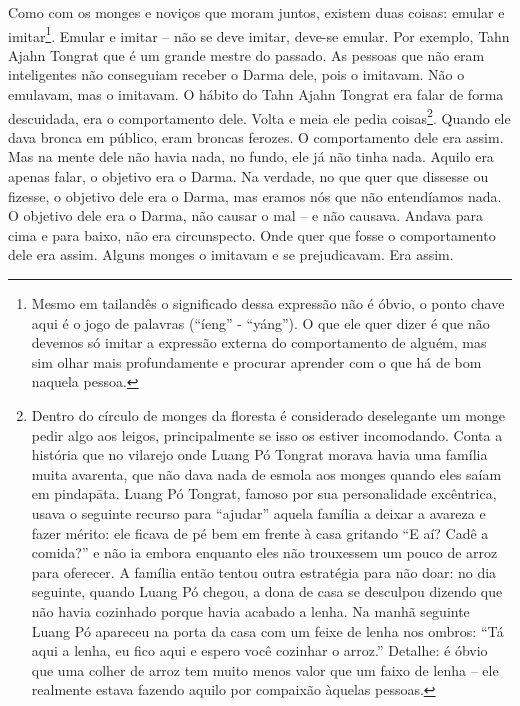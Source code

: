 Como com os monges e noviços que moram juntos, existem duas coisas:
emular e imitar\footnote{Mesmo em tailandês o significado dessa
expressão não é óbvio, o ponto chave aqui é o jogo de palavras
(“íeng” - “yáng”). O que ele quer dizer é que não devemos só imitar a
expressão externa do comportamento de alguém, mas sim olhar mais
profundamente e procurar aprender com o que há de bom naquela pessoa.}.
Emular e imitar – não se deve imitar, deve-se emular. Por exemplo, Tahn
Ajahn Tongrat que é um grande mestre do passado. As pessoas que não
eram inteligentes não conseguiam receber o Darma dele, pois o imitavam.
Não o emulavam, mas o imitavam. O hábito do Tahn Ajahn Tongrat era
falar de forma descuidada, era o comportamento dele. Volta e meia ele
pedia coisas\footnote{Dentro do círculo de monges da floresta é
considerado deselegante um monge pedir algo aos leigos, principalmente
se isso os estiver incomodando. Conta a história que no vilarejo onde
Luang Pó Tongrat morava havia uma família muita avarenta, que não dava
nada de esmola aos monges quando eles saíam em pindapāta. Luang Pó
Tongrat, famoso por sua personalidade excêntrica, usava o seguinte
recurso para “ajudar” aquela família a deixar a avareza e fazer mérito:
ele ficava de pé bem em frente à casa gritando “E aí? Cadê a comida?” e
não ia embora enquanto eles não trouxessem um pouco de arroz para
oferecer. A família então tentou outra estratégia para não doar: no dia
seguinte, quando Luang Pó chegou, a dona de casa se desculpou dizendo
que não havia cozinhado porque havia acabado a lenha. Na manhã seguinte
Luang Pó apareceu na porta da casa com um feixe de lenha nos ombros:
“Tá aqui a lenha, eu fico aqui e espero você cozinhar o arroz.”
Detalhe: é óbvio que uma colher de arroz tem muito menos valor que um
faixo de lenha – ele realmente estava fazendo aquilo por compaixão
àquelas pessoas.}. Quando ele dava bronca em público, eram broncas
ferozes. O comportamento dele era assim. Mas na mente dele não havia
nada, no fundo, ele já não tinha nada. Aquilo era apenas falar, o
objetivo era o Darma. Na verdade, no que quer que dissesse ou fizesse,
o objetivo dele era o Darma, mas eramos nós que não entendíamos nada. O
objetivo dele era o Darma, não causar o mal – e não causava. Andava
para cima e para baixo, não era circunspecto. Onde quer que fosse o
comportamento dele era assim. Alguns monges o imitavam e se
prejudicavam. Era assim.


